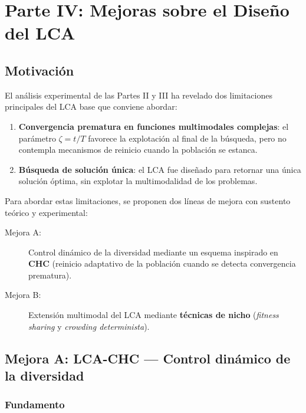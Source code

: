 
\newpage
\section{Parte IV: Mejoras sobre el Diseño del LCA}
\label{sec:parte4}

\subsection{Motivación}

El análisis experimental de las Partes II y III ha revelado dos limitaciones
principales del LCA base que conviene abordar:

\begin{enumerate}
  \item \textbf{Convergencia prematura en funciones multimodales complejas}: el parámetro
    $\zeta = t/T$ favorece la explotación al final de la búsqueda, pero no contempla
    mecanismos de reinicio cuando la población se estanca.
  \item \textbf{Búsqueda de solución única}: el LCA fue diseñado para retornar una única
    solución óptima, sin explotar la multimodalidad de los problemas.
\end{enumerate}

Para abordar estas limitaciones, se proponen dos líneas de mejora con sustento
teórico y experimental:

\begin{description}
  \item[Mejora A:] Control dinámico de la diversidad mediante un esquema inspirado en
    \textbf{CHC} (reinicio adaptativo de la población cuando se detecta convergencia prematura).
  \item[Mejora B:] Extensión multimodal del LCA mediante \textbf{técnicas de nicho}
    (\emph{fitness sharing} y \emph{crowding determinista}).
\end{description}

\subsection{Mejora A: LCA-CHC — Control dinámico de la diversidad}

\subsubsection{Fundamento}

